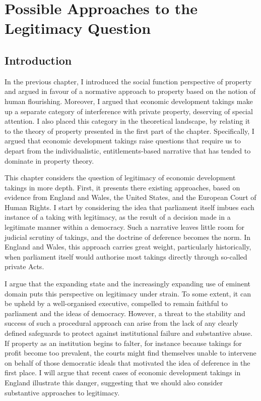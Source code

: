 
\chapter{Possible Approaches to the Legitimacy Question}\label{chap:2}

\section{Introduction}\label{sec:intro}

In the previous chapter, I introduced the social function perspective of property and argued in favour of a normative approach to property based on the notion of human flourishing. Moreover, I argued that economic development takings make up a separate category of interference with private property, deserving of special attention. I also placed this category in the theoretical landscape, by relating it to the theory of property presented in the first part of the chapter. Specifically, I argued that economic development takings raise questions that require us to depart from the individualistic, entitlements-based narrative that has tended to dominate in property theory.

This chapter considers the question of legitimacy of economic development takings in more depth. First, it presents there existing approaches, based on evidence from England and Wales, the United States, and the European Court of Human Rights. I start by considering the idea that parliament itself imbues each instance of a taking with legitimacy, as the result of a decision made in a legitimate manner within a democracy. Such a narrative leaves little room for judicial scrutiny of takings, and the doctrine of deference becomes the norm. In England and Wales, this approach carries great weight, particularly historically, when parliament itself would authorise most takings directly through so-called private Acts. 

I argue that the expanding state and the increasingly expanding use of eminent domain puts this perspective on legitimacy under strain. To some extent, it can be upheld by a well-organised executive, compelled to remain faithful to parliament and the ideas of democracy. However, a threat to the stability and success of such a procedural approach can arise from the lack of any clearly defined safeguards to protect against institutional failure and substantive abuse. If property as an institution begins to falter, for instance because takings for profit become too prevalent, the courts might find themselves unable to intervene on behalf of those democratic ideals that motivated the idea of deference in the first place. I will argue that recent cases of economic development takings in England illustrate this danger, suggesting that we should also consider substantive approaches to legitimacy.

